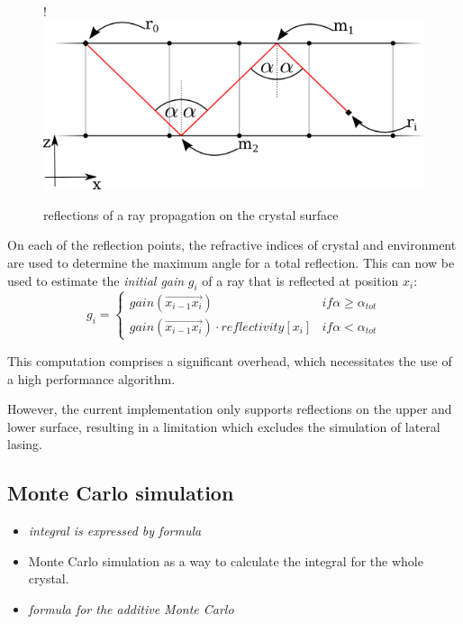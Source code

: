 \begin{figure}[H]
  \centerline{
     {!} {\includegraphics{./graphics/reflections_1.png}}
  }
  \caption{reflections of a ray propagation on the crystal surface}
  \label{graphic:reflections_2D}
\end{figure}


On each of the reflection points, the refractive indices of crystal and
environment are used to determine the maximum angle for a total reflection. This
can now be used to estimate the \emph{initial gain} $g_i$ of a ray that is
reflected at position $x_i$:
\[
  g_i = 
  \begin{cases}
    gain(\overrightarrow{x_{i-1}x_i}) & if \alpha \ge \alpha_{tot}  \\
    gain(\overrightarrow{x_{i-1}x_i}) \cdot reflectivity[x_i] & if \alpha < \alpha_{tot}   
  \end{cases}
\]

This computation comprises a significant overhead, which necessitates the use of
a high performance algorithm. 

However, the current implementation only supports reflections on the upper and
lower surface, resulting in a limitation which excludes the simulation of
lateral lasing.


\subsection{Monte Carlo simulation}
\label{subsec:monteCarlo}

\begin{itemize}

  \item \textit{integral is expressed by formula} \cite[Daniel's Thesis]{ASE2010}

  \item Monte Carlo simulation as a way to calculate the integral for the whole
    crystal.

  \item \textit{formula for the additive Monte Carlo}

\end{itemize}






